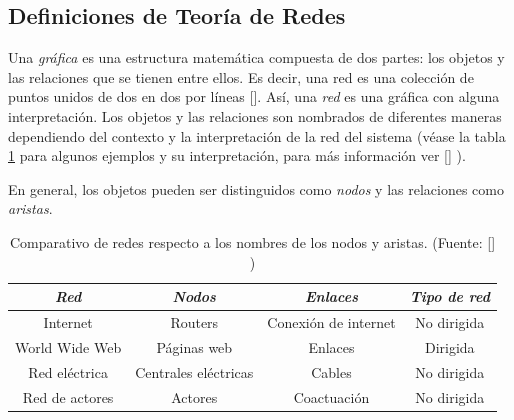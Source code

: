 \documentclass[../main.tex]{subfiles}
\begin{document}



\newpage
\subsection{Definiciones de Teoría de Redes}


 Una \textit{gráfica} es una estructura matemática compuesta de dos partes: los objetos y las relaciones que se tienen entre ellos. Es decir, una red es una colección de puntos unidos de dos en dos por líneas [\cite{newman2018networks}]. Así, una \textit{red} es una gráfica con alguna interpretación. Los objetos y las relaciones son nombrados de diferentes maneras dependiendo del contexto y la interpretación de la red del sistema (véase la tabla \ref{tab:marcoteorico_tabladenodosenlaces} para algunos ejemplos y su interpretación, para más información ver [\cite{barabasi2013network}] ). 

En general, los objetos pueden ser distinguidos como \textit{nodos} y las relaciones como \textit{aristas}. 

\newpage

\begin{table}[h!]
    \centering
    \caption{Comparativo de redes respecto a los nombres de los nodos y aristas. (Fuente: [\cite{barabasi2013network}] )}
    \begin{tabular}{c|c|c|c}
        \textit{\textbf{Red}} & \textbf{\textit{Nodos}} & \textbf{\textit{Enlaces}}  & \textbf{\textit{Tipo de red}}\\
        \hline
        Internet & Routers & Conexión de internet & No dirigida \\
        World Wide Web & Páginas web & Enlaces & Dirigida \\
        Red eléctrica & Centrales eléctricas  & Cables & No dirigida \\
        Red de actores & Actores  & Coactuación & No dirigida \\
    \end{tabular}
    
    \label{tab:marcoteorico_tabladenodosenlaces}
\end{table}
\end{document}
